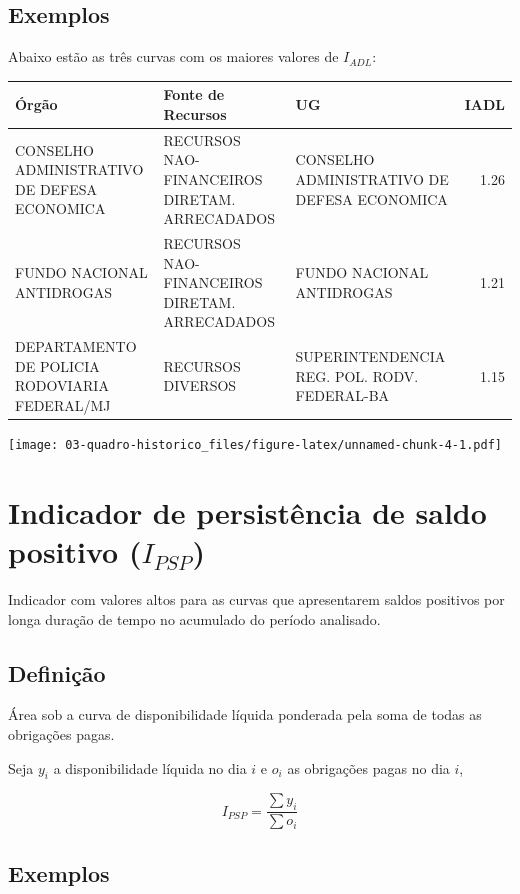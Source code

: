 \documentclass[
]{book}
\begin{document}
\hypertarget{exemplos}{%
\subsection{Exemplos}\label{exemplos}}

Abaixo estão as três curvas com os maiores valores de \(I_{ADL}\):

\begin{tabular}{l|l|l|r}
\hline
Órgão & Fonte de Recursos & UG & IADL\\
\hline
CONSELHO ADMINISTRATIVO DE DEFESA ECONOMICA & RECURSOS NAO-FINANCEIROS DIRETAM. ARRECADADOS & CONSELHO ADMINISTRATIVO DE DEFESA ECONOMICA & 1.26\\
\hline
FUNDO NACIONAL ANTIDROGAS & RECURSOS NAO-FINANCEIROS DIRETAM. ARRECADADOS & FUNDO NACIONAL ANTIDROGAS & 1.21\\
\hline
DEPARTAMENTO DE POLICIA RODOVIARIA FEDERAL/MJ & RECURSOS DIVERSOS & SUPERINTENDENCIA REG. POL. RODV. FEDERAL-BA & 1.15\\
\hline
\end{tabular}

\texttt{[image: 03-quadro-historico\_files/figure-latex/unnamed-chunk-4-1.pdf]}

\hypertarget{indicador-de-persistuxeancia-de-saldo-positivo-i_psp}{%
\section{\texorpdfstring{Indicador de persistência de saldo positivo (\(I_{PSP}\))}{Indicador de persistência de saldo positivo (I\_\{PSP\})}}\label{indicador-de-persistuxeancia-de-saldo-positivo-i_psp}}

Indicador com valores altos para as curvas que apresentarem saldos positivos por longa duração de tempo no acumulado do período analisado.

\hypertarget{definiuxe7uxe3o-1}{%
\subsection{Definição}\label{definiuxe7uxe3o-1}}

Área sob a curva de disponibilidade líquida ponderada pela soma de todas as obrigações pagas.

Seja \(y_i\) a disponibilidade líquida no dia \(i\) e \(o_i\) as obrigações pagas no dia \(i\),

\[
I_{PSP} = \frac{\sum y_i}{\sum o_i}
\]

\hypertarget{exemplos-1}{%
\subsection{Exemplos}\label{exemplos-1}}
\end{document}
